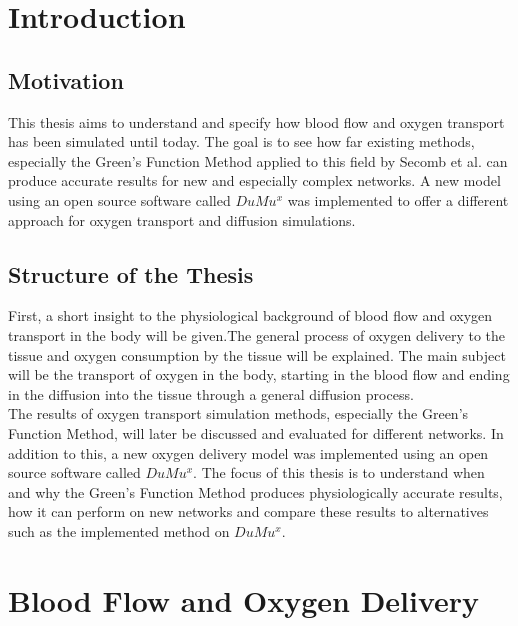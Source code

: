 
\section{Introduction}
\label{s:Introduction}

\subsection{Motivation}

This thesis aims to understand and specify how blood flow and oxygen transport has been simulated until today. The goal is to see how far existing methods, especially the Green's Function Method applied to this field by Secomb et al. \cite{Secomb2004} can produce accurate results for new and especially complex networks. A new model using an open source software called $DuMu^x$ \cite{flemischdumux} was implemented to offer a different approach for oxygen transport and diffusion simulations.

\subsection{Structure of the Thesis}

First, a short insight to the physiological background of blood flow and oxygen transport in the body will be given.The general process of oxygen delivery to the tissue and oxygen consumption by the tissue will be explained. The main subject will be the transport of oxygen in the body, starting in the blood flow and ending in the diffusion into the tissue through a general diffusion process.
\\The results of oxygen transport simulation methods, especially the Green's Function Method, will later be discussed and evaluated for different networks. In addition to this, a new oxygen delivery model was implemented using an open source software called $DuMu^x$. The focus of this thesis is to understand when and why the Green's Function Method produces physiologically accurate results, how it can perform on new networks and compare these results to alternatives such as the implemented method on $DuMu^x$.

\section{Blood Flow and Oxygen Delivery}

